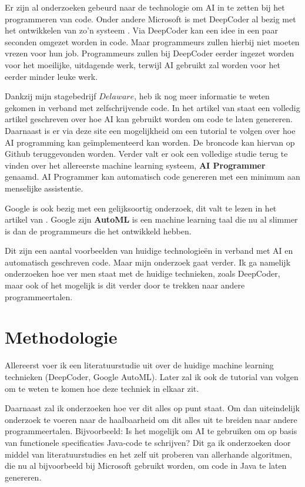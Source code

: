 Er zijn al onderzoeken gebeurd naar de technologie om AI in te zetten bij het programmeren van code. Onder andere Microsoft is met DeepCoder al bezig met het ontwikkelen van zo'n systeem \autocite{DeepCoder}. Via DeepCoder kan een idee in een paar seconden omgezet worden in code. Maar programmeurs zullen hierbij niet moeten vrezen voor hun job. Programmeurs zullen bij DeepCoder eerder ingezet worden voor het moeilijke, uitdagende werk, terwijl AI gebruikt zal worden voor het eerder minder leuke werk.

Dankzij mijn stagebedrijf \(Delaware\), heb ik nog meer informatie te weten gekomen in verband met zelfschrijvende code. In het artikel van  \textcite{primaryObject} staat een volledig artikel geschreven over hoe AI kan gebruikt worden om code te laten genereren. Daarnaast is er via deze site een mogelijkheid om een tutorial te volgen over hoe AI programming kan geïmplementeerd kan worden. De broncode kan hiervan op Github \autocite{github} teruggevonden worden. Verder valt er ook een volledige studie \autocite{aiProgrammer} terug te vinden over het allereerste machine learning systeem, \textbf{AI Programmer} genaamd. AI Programmer kan automatisch code genereren met een minimum aan menselijke assistentie.

Google is ook bezig met een gelijksoortig onderzoek, dit valt te lezen in het artikel van \textcite{greene}. Google zijn \textbf{AutoML} is een machine learning taal die nu al slimmer is dan de programmeurs die het ontwikkeld hebben.

Dit zijn een aantal voorbeelden van huidige technologieën in verband met AI en automatisch geschreven code. Maar mijn onderzoek gaat verder. Ik ga namelijk onderzoeken hoe ver men staat met de huidige technieken, zoals DeepCoder, maar ook of het mogelijk is dit verder door te trekken naar andere programmeertalen.

\section{Methodologie}
\label{sec:methodologie}

Allereerst voer ik een literatuurstudie uit over de huidige machine learning technieken (DeepCoder, Google AutoML). Later zal ik ook de tutorial van \textcite{github} volgen om te weten te komen hoe deze techniek in elkaar zit.

Daarnaast zal ik onderzoeken hoe ver dit alles op punt staat. Om dan uiteindelijk onderzoek te voeren naar de haalbaarheid om dit alles uit te breiden naar andere programmeertalen. Bijvoorbeeld: Is het mogelijk om AI te gebruiken om op basis van functionele specificaties Java-code te schrijven? Dit ga ik onderzoeken door middel van literatuurstudies en het zelf uit proberen van allerhande algoritmen, die nu al bijvoorbeeld bij Microsoft gebruikt worden, om code in Java te laten genereren. 

